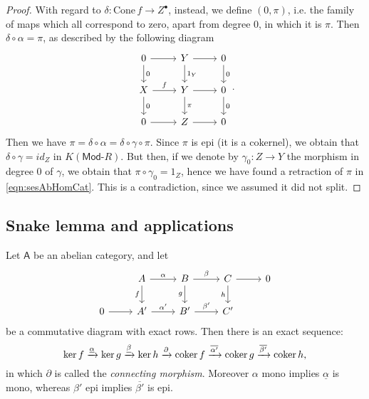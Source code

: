 \begin{proof}
	With regard to $\delta: \mathrm{Cone}\, f \to Z^\bullet$, instead, we define $(0, \pi)$, i.e.
	the family of maps which all correspond to zero, apart from degree $0$, in which it is $\pi$.
	Then $\delta \circ \alpha = \pi$, as described by the following diagram
	\begin{equation}
	\begin{tikzcd}
		0 \arrow[r, "", rightarrow] \arrow[d, "0", rightarrow] &
		Y \arrow[r, "", rightarrow] \arrow[d, "1_Y", rightarrow] &
		0 \arrow[d, "0", rightarrow] \\
		X \arrow[r, "f", rightarrow] \arrow[d, "0", rightarrow] &
		Y \arrow[r, "", rightarrow] \arrow[d, "\pi", rightarrow] &
		0 \arrow[d, "0", rightarrow] \\
		0 \arrow[r, "", rightarrow] &
		Z \arrow[r, "", rightarrow] &
		0
	\end{tikzcd}
	.\end{equation} 
	Then we have $\pi = \delta \circ \alpha = \delta \circ \gamma \circ \pi$.
	Since $\pi$ is epi (it is a cokernel), we obtain that
	$\delta \circ \gamma = id_Z$ in $K(\mathsf{Mod}\text{-}R)$.
	But then, if we denote by $\gamma_0: Z \to Y$ the morphism in degree $0$ of $\gamma$, we obtain
	that $\pi \circ \gamma_0 = 1_Z$, hence we have found a retraction of $\pi$ in \eqref{eqn:sesAbHomCat}.
	This is a contradiction, since we assumed it did not split.
\end{proof}

\subsection{Snake lemma and applications}
\begin{lem}
	Let $\mathsf{A}$ be an abelian category, and let
	\begin{equation}
	\begin{tikzcd}
		&
		A \arrow[r, "\alpha", rightarrow] \arrow[d, "f"', rightarrow] &
		B \arrow[r, "\beta", rightarrow] \arrow[d, "g"', rightarrow] &
		C \arrow[r, "", rightarrow] \arrow[d, "h"', rightarrow] &
		0 \\
		0 \arrow[r, "", rightarrow] &
		A' \arrow[r, "\alpha'", rightarrow] &
		B' \arrow[r, "\beta'", rightarrow] &
		C' &
	\end{tikzcd}
	\end{equation} 
	be a commutative diagram with exact rows.
	Then there is an exact sequence:
	\begin{equation}
	\ker f \xrightarrow{\underline{\alpha}} \ker g \xrightarrow{\underline{\beta}}
	\ker h \xrightarrow{\partial} \operatorname{coker} f \xrightarrow{\overline{\alpha'}} 
	\operatorname{coker} g \xrightarrow{\overline{\beta'}} \operatorname{coker} h
	,\end{equation} 
	in which $\partial$ is called the {\em connecting morphism}.
	Moreover $\alpha$ mono implies $\underline{\alpha}$ is mono,
	whereas $\beta'$ epi implies $\overline{\beta'}$ is epi.
\end{lem} 	

